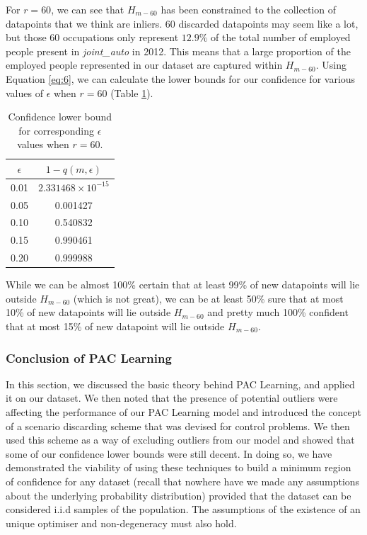 \documentclass[11pt]{article}
\begin{document}
For $r=60$, we can see that $H_{m-60}$ has been constrained to the collection of datapoints that we think are inliers. 60 discarded datapoints may seem like a lot, but those 60 occupations only represent $12.9\%$ of the total number of employed people present in \emph{joint\_auto} in 2012. This means that a large proportion of the employed people represented in our dataset are captured within $H_{m-60}$. Using Equation \ref{eq:6}, we can calculate the lower bounds for our confidence for various values of $\epsilon$ when $r=60$ (Table \ref{tab:confidence2}).


\begin{table}[]
\centering
\begin{tabular}{@{}cc@{}}
\toprule
\textbf{$\epsilon$} & \textbf{$1-q(m,\epsilon)$} \\ \midrule
0.01             & $2.331468\times10^{-15}$               \\
0.05             & 0.001427               \\
0.10             & 0.540832 \\ 
0.15             & 0.990461 \\ 
0.20             & 0.999988  \\ \bottomrule
\end{tabular}
\caption{Confidence lower bound for corresponding $\epsilon$ values when $r=60$.}
\label{tab:confidence2}
\end{table}



While we can be almost 100\% certain that at least 99\% of new datapoints will lie outside $H_{m-60}$ (which is not great), we can be at least 50\% sure that at most 10\% of new datapoints will lie outside $H_{m-60}$ and pretty much 100\% confident that at most 15\% of new datapoint will lie outside $H_{m-60}$.

\subsubsection*{Conclusion of PAC Learning}
In this section, we discussed the basic theory behind PAC Learning, and applied it on our dataset. We then noted that the presence of potential outliers were affecting the performance of our PAC Learning model and introduced the concept of a scenario discarding scheme that was devised for control problems. We then used this scheme as a way of excluding outliers from our model and showed that some of our confidence lower bounds were still decent. In doing so, we have demonstrated the viability of using these techniques to build a minimum region of confidence for any dataset (recall that nowhere have we made any assumptions about the underlying probability distribution) provided that the dataset can be considered i.i.d samples of the population. The assumptions of the existence of an unique optimiser and non-degeneracy must also hold.
\end{document}
